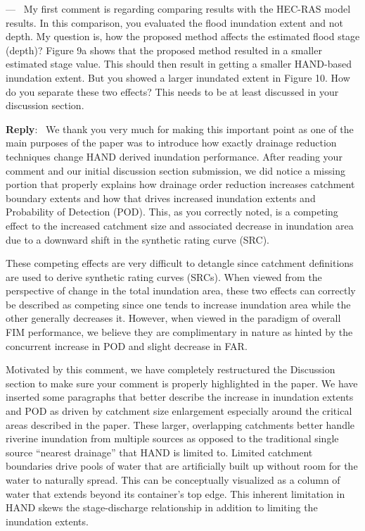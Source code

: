 \documentclass[11pt]{article}
\newcounter{reviewer}
\newcounter{point}[reviewer]
\renewcommand{\thepoint}{P\,\thereviewer.\arabic{point}}
\newenvironment{point}
   {\refstepcounter{point} \bigskip \noindent {\textbf{Reviewer~Point~\thepoint} } ---\ }
   {\par }
\newenvironment{reply}
   {\medskip \noindent \begin{sf}\textbf{Reply}:\  }
   {\medskip \end{sf}}
\begin{document}
\begin{point}
My first comment is regarding comparing results with the HEC-RAS model results.
In this comparison, you evaluated the flood inundation extent and not depth.
My question is, how the proposed method affects the estimated flood stage (depth)?
Figure 9a shows that the proposed method resulted in a smaller estimated stage value.
This should then result in getting a smaller HAND-based inundation extent.
But you showed a larger inundated extent in Figure 10.
How do you separate these two effects?
This needs to be at least discussed in your discussion section.
\label{pt:discussion}
\end{point}

\begin{reply}
We thank you very much for making this important point as one of the main purposes of the paper was to introduce how exactly drainage reduction techniques change HAND derived inundation performance.
After reading your comment and our initial discussion section submission, we did notice a missing portion that properly explains how drainage order reduction increases catchment boundary extents and how that drives increased inundation extents and Probability of Detection (POD).
This, as you correctly noted, is a competing effect to the increased catchment size and associated decrease in inundation area due to a downward shift in the synthetic rating curve (SRC).

These competing effects are very difficult to detangle since catchment definitions are used to derive synthetic rating curves (SRCs).
When viewed from the perspective of change in the total inundation area, these two effects can correctly be described as competing since one tends to increase inundation area while the other generally decreases it.
However, when viewed in the paradigm of overall FIM performance, we believe they are complimentary in nature as hinted by the concurrent increase in POD and slight decrease in FAR.

Motivated by this comment, we have completely restructured the Discussion section to make sure your comment is properly highlighted in the paper.
We have inserted some paragraphs that better describe the increase in inundation extents and POD as driven by catchment size enlargement especially around the critical areas described in the paper.
These larger, overlapping catchments better handle riverine inundation from multiple sources as opposed to the traditional single source ``nearest drainage'' that HAND is limited to.
Limited catchment boundaries drive pools of water that are artificially built up without room for the water to naturally spread.
This can be conceptually visualized as a column of water that extends beyond its container's top edge.
This inherent limitation in HAND skews the stage-discharge relationship in addition to limiting the inundation extents.


\end{reply}
\end{document}
